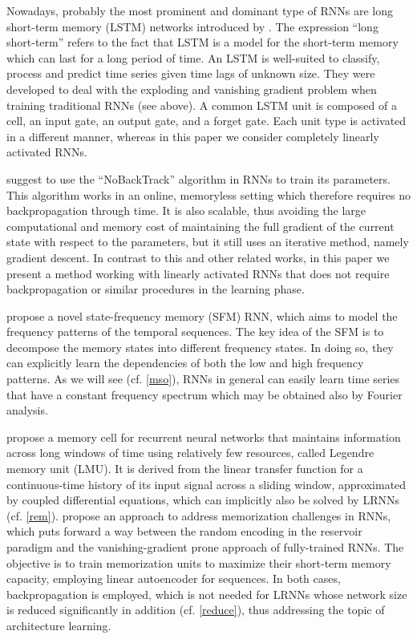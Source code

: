 \documentclass[twoside,11pt]{article}
\theoremstyle{definition}
\begin{document}
Nowadays, probably the most prominent and dominant type of RNNs are long
short-term memory (LSTM) networks introduced by \citet{HS97}. The expression \enquote{long
short-term} refers to the fact that LSTM is a model for the short-term memory
which can last for a long period of time. An LSTM is well-suited to classify,
process and predict time series given time lags of unknown size. They were
developed to deal with the exploding and vanishing gradient problem when
training traditional RNNs (see above). A common LSTM unit is composed of a cell,
an input gate, an output gate, and a forget gate. Each unit type is activated in
a different manner, whereas in this paper we consider completely linearly
activated RNNs.

\citet{OTC15} suggest to use the \enquote{NoBackTrack} algorithm in RNNs to
train its parameters. This algorithm works in an online, memoryless setting
which therefore requires no backpropagation through time. It is also scalable,
thus avoiding the large computational and memory cost of maintaining the full
gradient of the current state with respect to the parameters, but it still uses
an iterative method, namely gradient descent. In contrast to this and other
related works, in this paper we present a method working with linearly activated
RNNs that does not require backpropagation or similar procedures in the learning
phase.

\citet{HQ17} propose a novel state-frequency memory (SFM) RNN,
which aims to model the frequency patterns of the temporal sequences.
The key idea of the SFM is to decompose the memory states into different
frequency states. In doing so, they can explicitly learn the dependencies of
both the low and high frequency patterns. As we will see (cf. \cref{mso}),
RNNs in general can easily learn time series that have a constant frequency
spectrum which may be obtained also by Fourier analysis.

\citet{VKE19} propose a memory cell for recurrent neural networks that maintains
information across long windows of time using relatively few resources, called
Legendre memory unit (LMU). It is derived from the linear transfer function for
a continuous-time history of its input signal across a sliding window,
approximated by coupled differential equations, which can implicitly also be
solved by LRNNs (cf. \cref{rem}).
\citet{CSB21} propose an approach to address memorization challenges in RNNs,
which puts forward a way between the random encoding in the reservoir paradigm
and the vanishing-gradient prone approach of fully-trained RNNs. The objective
is to train memorization units to maximize their short-term memory capacity,
employing linear autoencoder for sequences. In both cases, backpropagation is
employed, which is not needed for LRNNs whose network size is reduced
significantly in addition (cf. \cref{reduce}), thus addressing the topic of
architecture learning.
\end{document}
